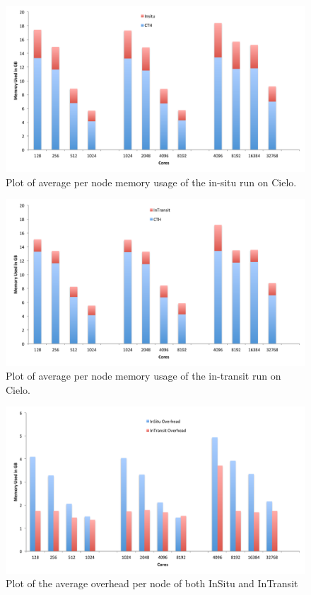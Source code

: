 \begin{figure}[htb]
  \centering
  \includegraphics[width=\linewidth]{figures/MemoryUsageInSituPerNode.pdf}
  \caption{Plot of average per node memory usage of the in-situ run on Cielo.}
  \label{fig:MemoryInSituPerNode}
\end{figure}

\begin{figure}[htb]
  \centering
  \includegraphics[width=\linewidth]{figures/MemoryUsageInTransitPerNode.pdf}
  \caption{Plot of average per node memory usage of the in-transit run on Cielo.}
  \label{fig:MemoryInTransitPerNode}
\end{figure}

\begin{figure}[htb]
  \centering
  \includegraphics[width=\linewidth]{figures/MemoryUsageCompare.pdf}
  \caption{Plot of the average overhead per node of both InSitu and InTransit}
  \label{fig:MemoryCompare}
\end{figure}

